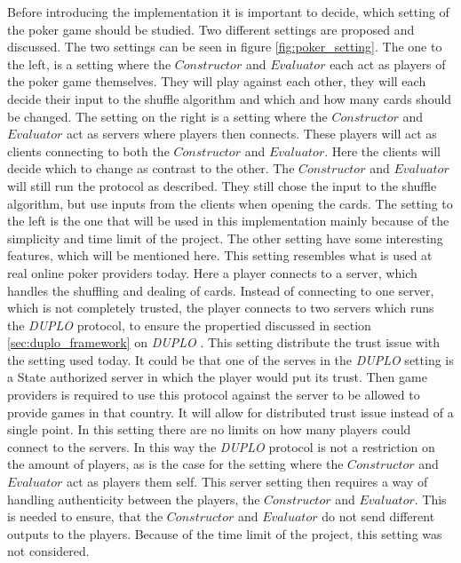 \documentclass[twoside,11pt,openright]{report}
\newcommand{\DUPLO}{\textit{DUPLO} }
\begin{document}
Before introducing the implementation it is important to decide, which setting of the poker game should be studied. Two different settings are proposed and discussed. The two settings can be seen in figure \ref{fig:poker_setting}. The one to the left, is a setting where the $Constructor$ and $Evaluator$ each act as players of the poker game themselves. They will play against each other, they will each decide their input to the shuffle algorithm and which and how many cards should be changed. The setting on the right is a setting where the $Constructor$ and $Evaluator$ act as servers where players then connects. These players will act as clients connecting to both the $Constructor$ and $Evaluator$. Here the clients will decide which to change as contrast to the other. The $Constructor$ and $Evaluator$ will still run the protocol as described. They still chose the input to the shuffle algorithm, but use inputs from the clients when opening the cards. The setting to the left is the one that will be used in this implementation mainly because of the simplicity and time limit of the project. The other setting have some interesting features, which will be mentioned here. This setting resembles what is used at real online poker providers today. Here a player connects to a server, which handles the shuffling and dealing of cards. Instead of connecting to one server, which is not completely trusted, the player connects to two servers which runs the \DUPLO protocol, to ensure the propertied discussed in section \ref{sec:duplo_framework} on \DUPLO. This setting distribute the trust issue with the setting used today. It could be that one of the serves in the \DUPLO setting is a State authorized server in which the player would put its trust. Then game providers is required to use this protocol against the server to be allowed to provide games in that country. It will allow for distributed trust issue instead of a single point. In this setting there are no limits on how many players could connect to the servers. In this way the \DUPLO protocol is not a restriction on the amount of players, as is the case for the setting where the $Constructor$ and $Evaluator$ act as players them self. This server setting then requires a way of handling authenticity between the players, the $Constructor$ and $Evaluator$. This is needed to ensure, that the $Constructor$ and $Evaluator$ do not send different outputs to the players. Because of the time limit of the project, this setting was not considered.

\bigskip
\end{document}
